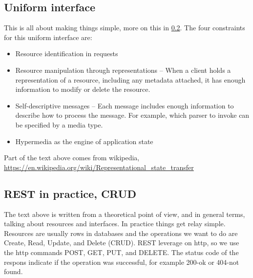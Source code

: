 \subsection{Uniform interface}
This is all about making things simple, more on this in \ref{section:crud}. The four constraints for this uniform interface are:
\begin{itemize}
  \item Resource identification in requests
  \item Resource manipulation through representations -- When a client holds a representation of a resource, including any metadata attached, it has enough information to modify or delete the resource.
  \item Self-descriptive messages -- Each message includes enough information to describe how to process the message. For example, which parser to invoke can be specified by a media type.
  \item Hypermedia as the engine of application state
 \end{itemize}
 
 Part of the text above comes from wikipedia,\\ \url{https://en.wikipedia.org/wiki/Representational_state_transfer}

\subsection{REST in practice, CRUD} \label{section:crud}
The text above is written from a theoretical point of view, and in general terms, talking about resources and interfaces. In practice things get relay simple. Resources are usually rows in databases and the operations we want to do are Create, Read, Update, and Delete (CRUD). REST leverage on http, so we use the http commands POST, GET, PUT, and DELETE. The status code of the respons indicate if the operation was successful, for example 200-ok or 404-not found.

